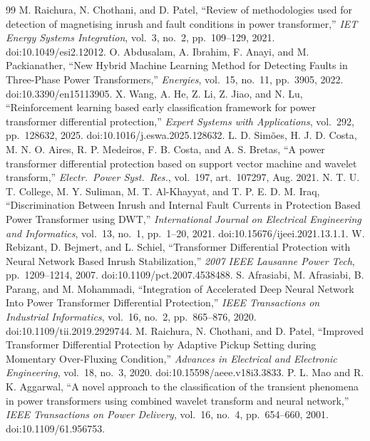\documentclass[12pt,a4paper,oneside]{report}
\begin{document}
\begin{thebibliography}{99}
 M. Raichura, N. Chothani, and D. Patel, ``Review of methodologies used for detection of magnetising inrush and fault conditions in power transformer,'' \textit{IET Energy Systems Integration}, vol.~3, no.~2, pp.~109--129, 2021. doi:10.1049/esi2.12012.
 O. Abdusalam, A. Ibrahim, F. Anayi, and M. Packianather, ``New Hybrid Machine Learning Method for Detecting Faults in Three-Phase Power Transformers,'' \textit{Energies}, vol.~15, no.~11, pp.~3905, 2022. doi:10.3390/en15113905.
 X. Wang, A. He, Z. Li, Z. Jiao, and N. Lu, ``Reinforcement learning based early classification framework for power transformer differential protection,'' \textit{Expert Systems with Applications}, vol.~292, pp.~128632, 2025. doi:10.1016/j.eswa.2025.128632.
 L. D. Sim\~{o}es, H. J. D. Costa, M. N. O. Aires, R. P. Medeiros, F. B. Costa, and A. S. Bretas, ``A power transformer differential protection based on support vector machine and wavelet transform,'' \textit{Electr.\ Power Syst.\ Res.}, vol.~197, art.~107297, Aug. 2021.
 N. T. U. T. College, M. Y. Suliman, M. T. Al-Khayyat, and T. P. E. D. M. Iraq, ``Discrimination Between Inrush and Internal Fault Currents in Protection Based Power Transformer using DWT,'' \textit{International Journal on Electrical Engineering and Informatics}, vol.~13, no.~1, pp.~1--20, 2021. doi:10.15676/ijeei.2021.13.1.1.
 W. Rebizant, D. Bejmert, and L. Schiel, ``Transformer Differential Protection with Neural Network Based Inrush Stabilization,'' \textit{2007 IEEE Lausanne Power Tech}, pp.~1209--1214, 2007. doi:10.1109/pct.2007.4538488.
 S. Afrasiabi, M. Afrasiabi, B. Parang, and M. Mohammadi, ``Integration of Accelerated Deep Neural Network Into Power Transformer Differential Protection,'' \textit{IEEE Transactions on Industrial Informatics}, vol.~16, no.~2, pp.~865--876, 2020. doi:10.1109/tii.2019.2929744.
 M. Raichura, N. Chothani, and D. Patel, ``Improved Transformer Differential Protection by Adaptive Pickup Setting during Momentary Over-Fluxing Condition,'' \textit{Advances in Electrical and Electronic Engineering}, vol.~18, no.~3, 2020. doi:10.15598/aeee.v18i3.3833.
 P. L. Mao and R. K. Aggarwal, ``A novel approach to the classification of the transient phenomena in power transformers using combined wavelet transform and neural network,'' \textit{IEEE Transactions on Power Delivery}, vol.~16, no.~4, pp.~654--660, 2001. doi:10.1109/61.956753.

\end{thebibliography}
\end{document}
